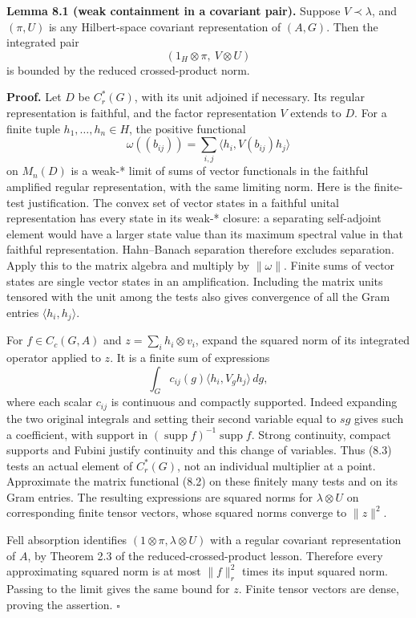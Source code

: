 \documentclass[
  11pt,
]{article}
\begin{document}
\textbf{Lemma 8.1 (weak containment in a covariant pair).} Suppose
\(V\prec\lambda\), and \((\pi,U)\) is any Hilbert-space covariant
representation of \((A,G)\). Then the integrated pair \[
(1_H\otimes\pi,\ V\otimes U)
\tag{8.1}
\] is bounded by the reduced crossed-product norm.

\textbf{Proof.} Let \(D\) be \(C_r^*(G)\), with its unit adjoined if
necessary. Its regular representation is faithful, and the factor
representation \(V\) extends to \(D\). For a finite tuple
\(h_1,\ldots,h_n\in H\), the positive functional \[
\omega((b_{ij}))=
 \sum_{i,j}\langle h_i,V(b_{ij})h_j\rangle
\tag{8.2}
\] on \(M_n(D)\) is a weak-* limit of sums of vector functionals in the
faithful amplified regular representation, with the same limiting norm.
Here is the finite-test justification. The convex set of vector states
in a faithful unital representation has every state in its weak-*
closure: a separating self-adjoint element would have a larger state
value than its maximum spectral value in that faithful representation.
Hahn--Banach separation therefore excludes separation. Apply this to the
matrix algebra and multiply by \(\|\omega\|\). Finite sums of vector
states are single vector states in an amplification. Including the
matrix units tensored with the unit among the tests also gives
convergence of all the Gram entries \(\langle h_i,h_j\rangle\).

For \(f\in C_c(G,A)\) and \(z=\sum_i h_i\otimes v_i\), expand the
squared norm of its integrated operator applied to \(z\). It is a finite
sum of expressions \[
\int_G c_{ij}(g)\langle h_i,V_g h_j\rangle\,dg,
\tag{8.3}
\] where each scalar \(c_{ij}\) is continuous and compactly supported.
Indeed expanding the two original integrals and setting their second
variable equal to \(sg\) gives such a coefficient, with support in
\((\operatorname{supp}f)^{-1}\operatorname{supp}f\). Strong continuity,
compact supports and Fubini justify continuity and this change of
variables. Thus (8.3) tests an actual element of \(C_r^*(G)\), not an
individual multiplier at a point. Approximate the matrix functional
(8.2) on these finitely many tests and on its Gram entries. The
resulting expressions are squared norms for \(\lambda\otimes U\) on
corresponding finite tensor vectors, whose squared norms converge to
\(\|z\|^2\).

Fell absorption identifies \((1\otimes\pi,\lambda\otimes U)\) with a
regular covariant representation of \(A\), by Theorem 2.3 of the
reduced-crossed-product lesson. Therefore every approximating squared
norm is at most \(\|f\|_r^2\) times its input squared norm. Passing to
the limit gives the same bound for \(z\). Finite tensor vectors are
dense, proving the assertion. \(\square\)
\end{document}
